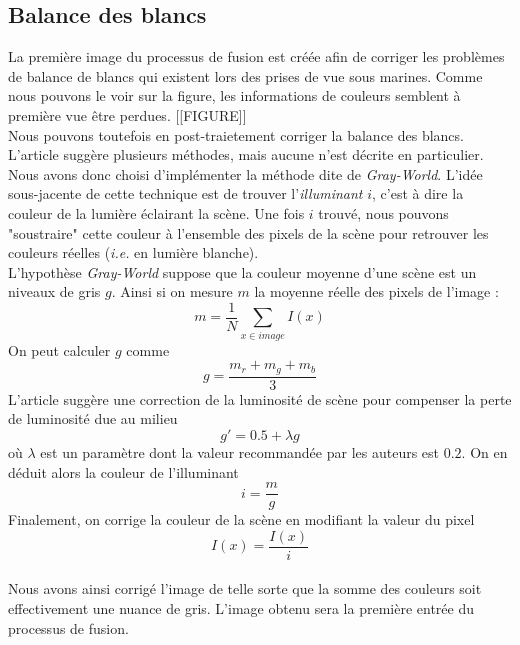 \documentclass[twoside]{article}
\begin{document}
\begin{multicols}{2}
\subsection{Balance des blancs}
La première image du processus de fusion est créée afin de corriger les problèmes de balance de blancs qui existent lors des prises de vue sous marines. Comme nous pouvons le voir sur la figure, les informations de couleurs semblent à première vue être perdues. [[FIGURE]]\\
Nous pouvons toutefois en post-traietement corriger la balance des blancs. L'article suggère plusieurs méthodes, mais aucune n'est décrite en particulier. Nous avons donc choisi d'implémenter la méthode dite de \emph{Gray-World}. L'idée sous-jacente de cette technique est de trouver l'\emph{illuminant} $i$, c'est à dire la couleur de la lumière éclairant la scène. Une fois $i$ trouvé, nous pouvons "soustraire" cette couleur à l'ensemble des pixels de la scène pour retrouver les couleurs réelles (\emph{i.e.} en lumière blanche).\\
L'hypothèse \emph{Gray-World} suppose que la couleur moyenne d'une scène est un niveaux de gris $g$. Ainsi si on mesure $m$ la moyenne réelle des pixels de l'image : $$m = \frac{1}{N}\sum_{x \in image}I(x)$$ On peut calculer $g$ comme $$g = \frac{m_r + m_g + m_b}{3}$$ L'article suggère une correction de la luminosité de scène pour compenser la perte de luminosité due au milieu $$g' = 0.5 + \lambda g$$ où $\lambda$ est un paramètre dont la valeur recommandée par les auteurs est $0.2$. On en déduit alors la couleur de l'illuminant $$ i = \frac{m}{g}$$ Finalement, on corrige la couleur de la scène en modifiant la valeur du pixel $$I(x) = \frac{I(x)}{i}$$\\
Nous avons ainsi corrigé l'image de telle sorte que la somme des couleurs soit effectivement une nuance de gris. L'image obtenu sera la première entrée du processus de fusion.


\end{multicols}
\end{document}
